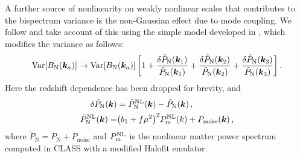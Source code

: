 A further source of nonlinearity on weakly nonlinear scales that contributes to the bispectrum variance  is the non-Gaussian effect due to mode coupling. We follow \cite{Karagiannis:2018jdt,Maartens:2019yhx} and  take account of this using the simple model developed in \cite{Chan:2016ehg}, which modifies the variance as follows: 
\begin{equation}
\mathrm{Var} [{B_{\mathrm N}}(\bm {k}_a)]  \to  \mathrm{Var}  [{B_{\mathrm N}}(\bm {k}_a)] \left[1+  
\frac{\delta\tilde{P}_{\mathrm N}(\bm {k}_1)}{\tilde{P}_{\mathrm N}(\bm {k}_1)} + \frac{\delta\tilde{P}_{\mathrm N}(\bm {k}_2)}{\tilde{P}_{\mathrm N}(\bm {k}_2)} + \frac{\delta\tilde{P}_{\mathrm N}(\bm {k}_3)}{\tilde{P}_{\mathrm N}(\bm {k}_3)}\right]  .
 \label{eq:e2.14}
\end{equation}
 Here the redshift dependence  has been dropped for brevity, and
\begin{align}
\delta\tilde{P}_{\mathrm N}(\bm {k}) & = \tilde{P}_{\mathrm N}^{\mathrm{NL}}(\bm {k}) - \tilde{P}_{\mathrm N}(\bm {k})\,, 
\label{eq:e2.15}\\
\tilde{P}^{\mathrm{NL}}_{\mathrm N}(\bm {k}) =& \big(b_{1}+f\mu^2\big)^2P^{\mathrm{NL}}_{\mathrm m}(k)+P_\mathrm{noise}(\bm {k})\,,\label{e2.15_1}
\end{align}
where $\tilde{P}_{\mathrm N}={P}_{\mathrm N}+P_\mathrm{noise}$ and
$P^{\mathrm{NL}}_{\mathrm m}$ is the nonlinear matter power spectrum computed in CLASS with a modified Halofit emulator.
%
%
